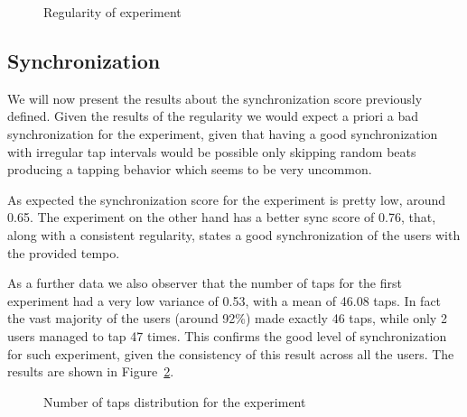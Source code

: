 \begin{figure}[h!t]
\centering
	{\setlength{\fboxsep}{1.5pt}
	 }
\caption{Regularity of \testsecond experiment}
\label{fig:reg2}
\end{figure}

\subsection{Synchronization}
We will now present the results about the synchronization score previously defined. Given the results of the regularity we would expect a priori a bad synchronization for the \testsecond experiment, given that having a good synchronization with irregular tap intervals would be possible only skipping random beats producing a tapping behavior which seems to be very uncommon.

As expected the synchronization score for the \testsecond experiment is pretty low, around 0.65. The \testfirst experiment on the other hand has a better sync score of 0.76, that, along with a consistent regularity, states a good synchronization of the users with the provided tempo.

As a further data we also observer that the number of taps for the first experiment had a very low variance of 0.53, with a mean of 46.08 taps. In fact the vast majority of the users (around 92\%) made exactly 46 taps, while only 2 users managed to tap 47 times. This confirms the good level of synchronization for such experiment, given the consistency of this result across all the users. The results are shown in Figure~\ref{fig:taps1}.

\begin{figure}[h!t]
\centering
	{\setlength{\fboxsep}{1.5pt}
	 }
\caption{Number of taps distribution for the \testfirst experiment}
\label{fig:taps1}
\end{figure}

